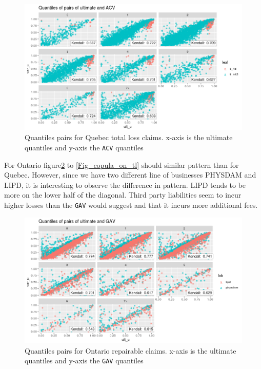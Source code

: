 	\begin{figure}[H]
		\begin{center}
			\includegraphics[scale=0.4]{Graphiques/qc_tl} 
			\renewcommand{\figurename}{Figure}
			\caption{Quantiles pairs for Quebec total loss claims. x-axis is the ultimate quantiles and y-axis the \texttt{ACV} quantiles}\label{Fig_copula_qc_tl}
		\end{center}
	\end{figure}

	For Ontario figure\ref{Fig_copula_on_rep} to \ref{Fig_copula_on_tl} should similar pattern than for Quebec. However, since we have two different line of businesses PHYSDAM and LIPD, it is interesting to observe the difference in pattern. LIPD tends to be more on the lower half of the diagonal. Third party liabilities seem to incur higher losses than the \texttt{GAV} would suggest and that it incurs more additional fees. 
	
		\begin{figure}[H]
		\begin{center}
			\includegraphics[scale=0.4]{Graphiques/on_rep} 
			\renewcommand{\figurename}{Figure}
			\caption{Quantiles pairs for Ontario repairable claims. x-axis is the ultimate quantiles and y-axis the \texttt{GAV} quantiles}\label{Fig_copula_on_rep}
		\end{center}
	\end{figure}
	
